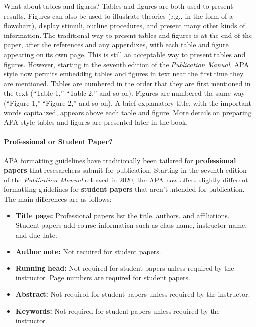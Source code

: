 \documentclass[
]{krantz}
\providecommand{\tightlist}{%
  \setlength{\itemsep}{0pt}\setlength{\parskip}{0pt}}
\begin{document}
What about tables and figures? Tables and figures are both used to present results. Figures can also be used to illustrate theories (e.g., in the form of a flowchart), display stimuli, outline procedures, and present many other kinds of information. The traditional way to present tables and figures is at the end of the paper, after the references and any appendixes, with each table and figure appearing on its own page. This is still an acceptable way to present tables and figures. However, starting in the seventh edition of the \emph{Publication Manual}, APA style now permits embedding tables and figures in text near the first time they are mentioned. Tables are numbered in the order that they are first mentioned in the text (``Table 1,'' ``Table 2,'' and so on). Figures are numbered the same way (``Figure 1,'' ``Figure 2,'' and so on). A brief explanatory title, with the important words capitalized, appears above each table and figure. More details on preparing APA-style tables and figures are presented later in the book.

\paragraph*{Professional or Student Paper?}\label{professional-or-student-paper}

APA formatting guidelines have traditionally been tailored for \textbf{professional papers} that resesarchers submit for publication. Starting in the seventh edition of the \emph{Publication Manual} released in 2020, the APA now offers slightly different formatting guidelines for \textbf{student papers} that aren't intended for publication. The main differences are as follows:

\begin{itemize}
\tightlist
\item
  \textbf{Title page:} Professional papers list the title, authors, and affiliations. Student papers add course information such as class name, instructor name, and due date.
\item
  \textbf{Author note:} Not required for student papers.
\item
  \textbf{Running head:} Not required for student papers unless required by the instructor. Page numbers are required for student papers.
\item
  \textbf{Abstract:} Not required for student papers unless required by the instructor.
\item
  \textbf{Keywords:} Not required for student papers unless required by the instructor.
\end{itemize}
\end{document}

